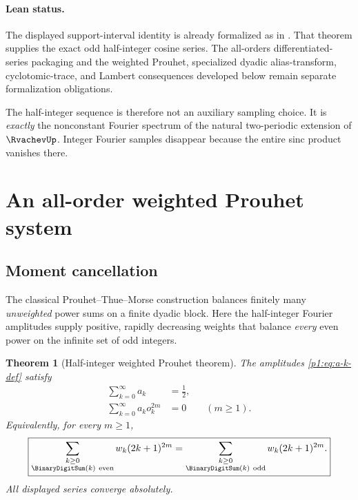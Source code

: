 \documentclass[11pt,oneside]{article}
\newtheorem{theorem}{Theorem}[section]
\theoremstyle{definition}
\theoremstyle{remark}
\begin{document}
\paragraph{Lean status.}
The displayed support-interval identity is already formalized as
 in
.  That theorem supplies the exact odd
half-integer cosine series.  The all-orders differentiated-series packaging
and the weighted Prouhet, specialized dyadic alias-transform, cyclotomic-trace, and Lambert
consequences developed below remain separate formalization obligations.

\begin{remark}
The half-integer sequence is therefore not an auxiliary sampling choice.  It is
\emph{exactly} the nonconstant Fourier spectrum of the natural two-periodic
extension of $\RvachevUp$.  Integer Fourier samples disappear because the entire sinc
product vanishes there.
\end{remark}

\section{An all-order weighted Prouhet system}\label{p1:sec:prouhet}

\subsection{Moment cancellation}

The classical Prouhet--Thue--Morse construction balances finitely many
\emph{unweighted} power sums on a finite dyadic block.  Here the half-integer
Fourier amplitudes supply positive, rapidly decreasing weights that balance
\emph{every} even power on the infinite set of odd integers.

\begin{theorem}[Half-integer weighted Prouhet theorem]\label{p1:thm:weighted-prouhet}
The amplitudes \eqref{p1:eq:a-k-def} satisfy
\begin{align}
 \sum_{k=0}^{\infty}a_k&=\frac12,
 \label{p1:eq:mass-half}\\
 \sum_{k=0}^{\infty}a_k o_k^{2m}&=0
 \qquad(m\ge1).
 \label{p1:eq:all-even-moments-zero}
\end{align}
Equivalently, for every $m\ge1$,
\begin{equation}\label{p1:eq:positive-prouhet}
 \boxed{
 \sum_{\substack{k\ge0\\\BinaryDigitSum(k)\ \mathrm{even}}}
 w_k(2k+1)^{2m}
 =
 \sum_{\substack{k\ge0\\\BinaryDigitSum(k)\ \mathrm{odd}}}
 w_k(2k+1)^{2m}.}
\end{equation}
All displayed series converge absolutely.
\end{theorem}
\end{document}

